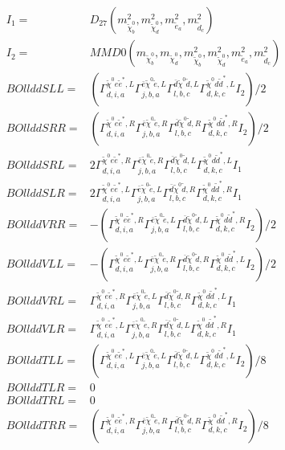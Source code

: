 \documentclass[A4,landscape]{article}
\begin{document}
\begin{align} 
I_1 = & D_{27}(m^2_{\tilde{\chi}^0_{{b}}}, m^2_{\tilde{\chi}^0_{{d}}}, m^2_{\tilde{e}_{{a}}}, m^2_{\tilde{d}_{{c}}}) \\ 
I_2 = & MMD0(m_{\tilde{\chi}^0_{{b}}}, m_{\tilde{\chi}^0_{{d}}}, m^2_{\tilde{\chi}^0_{{b}}}, m^2_{\tilde{\chi}^0_{{d}}}, m^2_{\tilde{e}_{{a}}}, m^2_{\tilde{d}_{{c}}}) \\ 
  BOllddSLL= & ( \Gamma^{\tilde{\chi}^0 e \tilde{e}^*,L}_{d, i, a} \Gamma^{\bar{e}\tilde{\chi}^0 \tilde{e} ,L}_{j, b, a} \Gamma^{\bar{d}\tilde{\chi}^0 \tilde{d} ,L}_{l, b, c} \Gamma^{\tilde{\chi}^0 d \tilde{d}^*,L}_{d, k, c} I_2)/2 \\ 
  BOllddSRR= & ( \Gamma^{\tilde{\chi}^0 e \tilde{e}^*,R}_{d, i, a} \Gamma^{\bar{e}\tilde{\chi}^0 \tilde{e} ,R}_{j, b, a} \Gamma^{\bar{d}\tilde{\chi}^0 \tilde{d} ,R}_{l, b, c} \Gamma^{\tilde{\chi}^0 d \tilde{d}^*,R}_{d, k, c} I_2)/2 \\ 
  BOllddSRL= & 2  \Gamma^{\tilde{\chi}^0 e \tilde{e}^*,R}_{d, i, a} \Gamma^{\bar{e}\tilde{\chi}^0 \tilde{e} ,R}_{j, b, a} \Gamma^{\bar{d}\tilde{\chi}^0 \tilde{d} ,L}_{l, b, c} \Gamma^{\tilde{\chi}^0 d \tilde{d}^*,L}_{d, k, c} I_1 \\ 
  BOllddSLR= & 2  \Gamma^{\tilde{\chi}^0 e \tilde{e}^*,L}_{d, i, a} \Gamma^{\bar{e}\tilde{\chi}^0 \tilde{e} ,L}_{j, b, a} \Gamma^{\bar{d}\tilde{\chi}^0 \tilde{d} ,R}_{l, b, c} \Gamma^{\tilde{\chi}^0 d \tilde{d}^*,R}_{d, k, c} I_1 \\ 
  BOllddVRR= & -( \Gamma^{\tilde{\chi}^0 e \tilde{e}^*,R}_{d, i, a} \Gamma^{\bar{e}\tilde{\chi}^0 \tilde{e} ,L}_{j, b, a} \Gamma^{\bar{d}\tilde{\chi}^0 \tilde{d} ,L}_{l, b, c} \Gamma^{\tilde{\chi}^0 d \tilde{d}^*,R}_{d, k, c} I_2)/2 \\ 
  BOllddVLL= & -( \Gamma^{\tilde{\chi}^0 e \tilde{e}^*,L}_{d, i, a} \Gamma^{\bar{e}\tilde{\chi}^0 \tilde{e} ,R}_{j, b, a} \Gamma^{\bar{d}\tilde{\chi}^0 \tilde{d} ,R}_{l, b, c} \Gamma^{\tilde{\chi}^0 d \tilde{d}^*,L}_{d, k, c} I_2)/2 \\ 
  BOllddVRL= &  \Gamma^{\tilde{\chi}^0 e \tilde{e}^*,R}_{d, i, a} \Gamma^{\bar{e}\tilde{\chi}^0 \tilde{e} ,L}_{j, b, a} \Gamma^{\bar{d}\tilde{\chi}^0 \tilde{d} ,R}_{l, b, c} \Gamma^{\tilde{\chi}^0 d \tilde{d}^*,L}_{d, k, c} I_1 \\ 
  BOllddVLR= &  \Gamma^{\tilde{\chi}^0 e \tilde{e}^*,L}_{d, i, a} \Gamma^{\bar{e}\tilde{\chi}^0 \tilde{e} ,R}_{j, b, a} \Gamma^{\bar{d}\tilde{\chi}^0 \tilde{d} ,L}_{l, b, c} \Gamma^{\tilde{\chi}^0 d \tilde{d}^*,R}_{d, k, c} I_1 \\ 
  BOllddTLL= & ( \Gamma^{\tilde{\chi}^0 e \tilde{e}^*,L}_{d, i, a} \Gamma^{\bar{e}\tilde{\chi}^0 \tilde{e} ,L}_{j, b, a} \Gamma^{\bar{d}\tilde{\chi}^0 \tilde{d} ,L}_{l, b, c} \Gamma^{\tilde{\chi}^0 d \tilde{d}^*,L}_{d, k, c} I_2)/8 \\ 
  BOllddTLR= & 0 \\ 
  BOllddTRL= & 0 \\ 
  BOllddTRR= & ( \Gamma^{\tilde{\chi}^0 e \tilde{e}^*,R}_{d, i, a} \Gamma^{\bar{e}\tilde{\chi}^0 \tilde{e} ,R}_{j, b, a} \Gamma^{\bar{d}\tilde{\chi}^0 \tilde{d} ,R}_{l, b, c} \Gamma^{\tilde{\chi}^0 d \tilde{d}^*,R}_{d, k, c} I_2)/8 \\ 
\end{align} 
\end{document}
